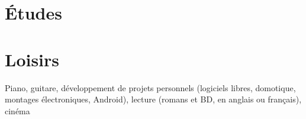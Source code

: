\documentclass[a4paper]{twentysecondcv} %
\begin{document}

\section{Études}

\begin{twenty} %
\end{twenty}


\section{Loisirs}


Piano, guitare, développement de projets personnels (logiciels libres, domotique, montages électroniques, Android), lecture (romans et BD, en anglais ou français), cinéma





\end{document}
